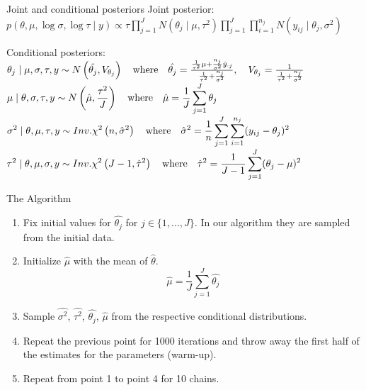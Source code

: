 \begin{frame}{Joint and conditional posteriors}
Joint posterior:\\
\vspace{0.1in}
$\displaystyle p(\theta,\mu,\log\sigma,\log\tau \mid y) \propto \tau \prod_{j=1}^J N(\theta_j \mid \mu,\tau^2) \prod_{j=1}^{J} \prod_{i=1}^{n_j} N(y_{ij} \mid \theta_j,\sigma^2)$

Conditional posteriors:\\
\vspace{0.1in}
$\theta_j \mid \mu, \sigma, \tau, y \sim N  \left( \hat{\theta_j},V_{\theta_j} \right)  \quad \mbox{where} \quad \hat{\theta_j} = { {{1 \over \tau^2} \mu + {n_j \over \sigma^2} \bar{y}_{\cdot j} } \over {{1 \over \tau^2}+{n_j \over \sigma^2}}}, \quad V_{\theta_j}= { 1 \over {{1 \over \tau^2}+{n_j \over \sigma^2}}} $ \\

$ \displaystyle \mu \mid \theta, \sigma, \tau, y \sim N \left( \hat{\mu},{\tau^2 \over J} \right) \quad \mbox{where} \quad \hat{\mu} = {1 \over J} \sum_{j=1}^{J} \theta_j $ \\

$ \displaystyle \sigma^2 \mid \theta, \mu, \tau, y \sim Inv.\chi^2 \left( n,\hat{\sigma}^2 \right)  \quad \mbox{where} \quad \hat{\sigma}^2 = {1 \over n} \sum_{j=1}^{J} \sum_{i=1}^{n_j} (y_{ij}-\theta_j)^2 $ \\

$ \displaystyle \tau^2 \mid \theta, \mu, \sigma, y \sim Inv.\chi^2 \left( J-1,\hat{\tau}^2 \right)  \quad \mbox{where} \quad \hat{\tau}^2 = {1 \over {J-1}} \sum_{j=1}^{J} (\theta_j-\mu)^2 $

\end{frame}

\begin{frame}{The Algorithm}
\begin{enumerate}
\item Fix initial values for $\hat{\theta_j}$ for $j \in \{1,\dots, J\}$. In our algorithm they are sampled from the initial data.
\item Initialize $\hat{\mu}$ with the mean of $\hat{\theta}$.
\begin{equation}
\hat{\mu} = \frac{1}{J} \sum_{j=1}^J \hat{\theta_j}
\end{equation}
\item Sample $\hat{\sigma^2}$, $\hat{\tau^2}$, $\hat{\theta_j}$, $\hat{\mu}$ from the respective conditional distributions.
\item Repeat the previous point for 1000 iterations and throw away the first half of the estimates for the parameters (warm-up).
\item Repeat from point 1 to point 4 for 10 chains.
\end{enumerate}
\end{frame}

